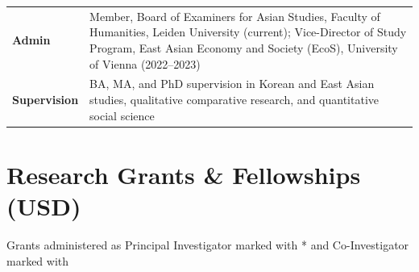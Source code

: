 \documentclass[11pt, a4paper]{article}
\begin{document}
\noindent\begin{tabularx}{\textwidth}{@{}p{2.4cm}X@{}}
  \textbf{Admin} & Member, Board of Examiners for Asian Studies, Faculty of Humanities, Leiden University (current); Vice-Director of Study Program, East Asian Economy and Society (EcoS), University of Vienna (2022--2023) \\[0.3em]
  \textbf{Supervision} & BA, MA, and PhD supervision in Korean and East Asian studies, qualitative comparative research, and quantitative social science
\end{tabularx}

\newpage

\linespread{1.08}\selectfont
\titlespacing{\section}{0pt}{0.85em}{0.45em}
\titlespacing{\subsection}{0pt}{0.65em}{0.32em}
\raggedbottom
{}

\section{Research Grants \& Fellowships {\normalsize\normalfont(USD)}}

{\small Grants administered as Principal Investigator marked with * and Co-Investigator marked with \dag}

\vspace{0.2em}
\end{document}
